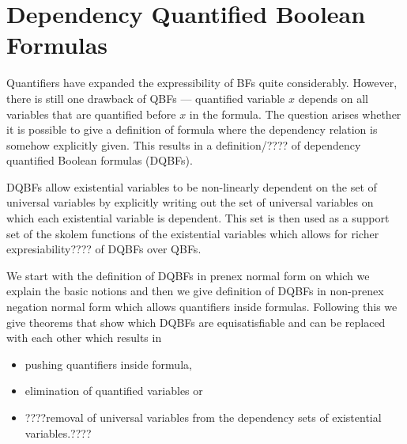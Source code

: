 \documentclass[
  digital, %
  twoside, %
  table,   %
  nolof,     %
  nolot,     %
]{fithesis3}
\let\setbuilder\set
\newcommand{\simpleset}[1]{\{{#1}\}}
\renewcommand{\set}[1]{\normalexpandarg\IfSubStr{#1}{|}{\setbuilder{#1}}{\simpleset{#1}}}
\theoremstyle{definition}
\theoremstyle{remark}
\newcommand{\BF}[1]{BF(#1)}
\begin{document}


\section{Dependency Quantified Boolean Formulas}
Quantifiers have expanded the expressibility of BFs quite considerably. However, there is still one drawback of QBFs --- quantified variable $x$ depends on all variables that are quantified before $x$ in the formula. The question arises whether it is possible to give a definition of formula where the dependency relation is somehow explicitly given. This results in a definition/???? of dependency quantified Boolean formulas (DQBFs).

DQBFs allow existential variables to be non-linearly dependent on the set of universal variables by explicitly writing out the set of universal variables on which each existential variable is dependent. This set is then used as a support set of the skolem functions of the existential variables which allows for richer expresiability???? of DQBFs over QBFs.  

We start with the definition of DQBFs in prenex normal form on which we explain the basic notions and then we give definition of DQBFs in non-prenex negation normal form which allows quantifiers inside formulas. Following this we give theorems that show which DQBFs are equisatisfiable and can be replaced with each other which results in
\begin{itemize}
    \item pushing quantifiers inside formula,
    \item elimination of quantified variables or
    \item ????removal of universal variables from the dependency sets of existential variables.????
\end{itemize}
\end{document}
